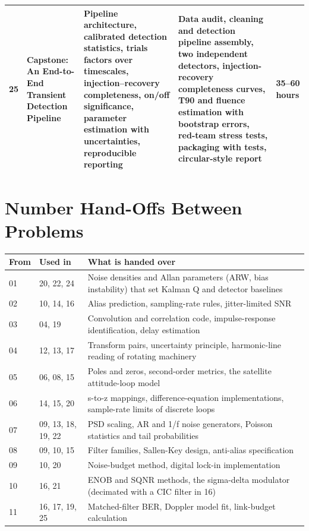 \documentclass[11pt,a4paper,landscape]{article}
\begin{document}
{\begin{longtable}{@{}p{0.6cm}p{3.7cm}p{8.2cm}p{7.6cm}p{2.0cm}@{}}
25 & \textbf{Capstone: An End-to-End Transient Detection Pipeline} & Pipeline architecture, calibrated detection statistics, trials factors over timescales, injection--recovery completeness, on/off significance, parameter estimation with uncertainties, reproducible reporting & Data audit, cleaning and detection pipeline assembly, two independent detectors, injection-recovery completeness curves, T90 and fluence estimation with bootstrap errors, red-team stress tests, packaging with tests, circular-style report & 35--60 hours\\\midrule
\bottomrule\end{longtable}}
\section*{Number Hand-Offs Between Problems}
{\small\renewcommand{\arraystretch}{1.2}
\begin{longtable}{@{}p{1.6cm}p{3.6cm}p{17cm}@{}}
\toprule \textbf{From} & \textbf{Used in} & \textbf{What is handed over}\\\midrule\endhead
01 & 20, 22, 24 & Noise densities and Allan parameters (ARW, bias instability) that set Kalman Q and detector baselines\\
02 & 10, 14, 16 & Alias prediction, sampling-rate rules, jitter-limited SNR\\
03 & 04, 19 & Convolution and correlation code, impulse-response identification, delay estimation\\
04 & 12, 13, 17 & Transform pairs, uncertainty principle, harmonic-line reading of rotating machinery\\
05 & 06, 08, 15 & Poles and zeros, second-order metrics, the satellite attitude-loop model\\
06 & 14, 15, 20 & s-to-z mappings, difference-equation implementations, sample-rate limits of discrete loops\\
07 & 09, 13, 18, 19, 22 & PSD scaling, AR and 1/f noise generators, Poisson statistics and tail probabilities\\
08 & 09, 10, 15 & Filter families, Sallen-Key design, anti-alias specification\\
09 & 10, 20 & Noise-budget method, digital lock-in implementation\\
10 & 16, 21 & ENOB and SQNR methods, the sigma-delta modulator (decimated with a CIC filter in 16)\\
11 & 16, 17, 19, 25 & Matched-filter BER, Doppler model fit, link-budget calculation\\

\end{longtable}}
\end{document}
